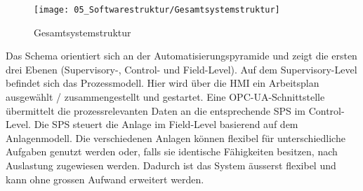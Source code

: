 \begin{figure}[h!]
	\centering
	\texttt{[image: 05\_Softwarestruktur/Gesamtsystemstruktur]}
	\captionsetup{justification=centering}
	\caption{Gesamtsystemstruktur}
	\label{fig:Gesamtsystemstruktur}
\end{figure}

Das Schema orientiert sich an der Automatisierungspyramide und zeigt die ersten drei Ebenen (Supervisory-, Control- und Field-Level). Auf dem Supervisory-Level befindet sich das Prozessmodell. Hier wird über die HMI ein Arbeitsplan ausgewählt / zusammengestellt und gestartet. Eine OPC-UA-Schnittstelle übermittelt die prozessrelevanten Daten an die entsprechende SPS im Control-Level. Die SPS steuert die Anlage im Field-Level basierend auf dem Anlagenmodell. Die verschiedenen Anlagen können flexibel für unterschiedliche Aufgaben genutzt werden oder, falls sie identische Fähigkeiten besitzen, nach Auslastung zugewiesen werden. Dadurch ist das System äusserst flexibel und kann ohne grossen Aufwand erweitert werden.
